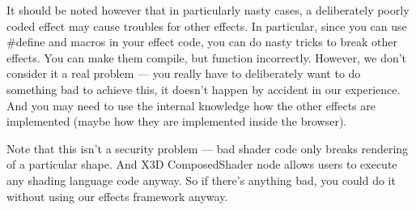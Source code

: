 \documentclass{acmsiggraph}                     %
\begin{document}
It should be noted however that in particularly nasty cases,
a deliberately poorly coded effect may cause troubles for other effects.
In particular, since you can use \#define and macros in your effect code,
you can do nasty tricks to break other effects. You can make them compile,
but function incorrectly. However, we don't consider
it a real problem --- you really have to deliberately want to do something
bad to achieve this, it doesn't happen by accident in our experience.
And you may need to use the internal knowledge
how the other effects are implemented (maybe how they are implemented
inside the browser).

Note that this isn't a security problem --- bad shader code only breaks
rendering of a particular shape. And X3D ComposedShader node allows users
to execute any shading language code anyway. So if there's anything bad,
you could do it without using our effects framework anyway.

\end{document}
